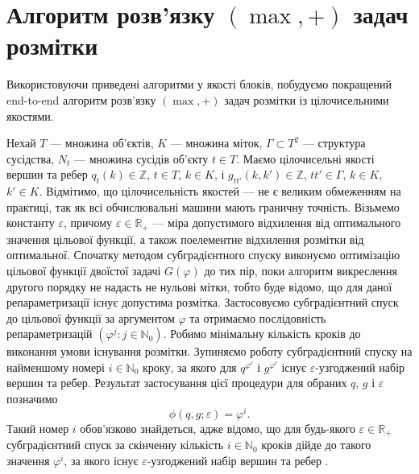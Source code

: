 \section{Алгоритм розв'язку $(\max,+)$ задач розмітки}

Використовуючи приведені алгоритми у якості блоків, побудуємо покращений 
end-to-end алгоритм розв'язку $(\max,+)$ задач розмітки із цілочисельними якостями.

Нехай $T$ --- множина об'єктів, $K$ --- множина міток, $\Gamma \subset T^2$ --- структура сусідства, 
$N_t$ --- множина сусідів об'єкту $t\in T$. Маємо цілочисельні якості вершин та ребер
$q_t(k)\in \mathbb{Z}$, $t\in T$, $k\in K$, і $g_{tt'}(k,k')\in \mathbb{Z}$, $tt'\in\Gamma$, $k\in K$, $k'\in K$.
Відмітимо, що цілочисельність якостей --- не є великим обмеженням на практиці, так як всі обчислювальні машини
мають граничну точність. Візьмемо константу $\varepsilon$, причому $\varepsilon\in\mathbb{R_+}$ --- міра допустимого 
відхилення від оптимального значення цільової функції, а також поелементне відхилення розмітки від оптимальної.
Спочатку методом субградієнтного спуску виконуємо оптимізацію цільової функції двоїстої задачі $G(\varphi)$ до тих пір, поки алгоритм
викреслення другого порядку не надасть не нульові мітки, тобто буде відомо, що 
для даної репараметризації існує допустима розмітка. Застосовуємо субградієнтний 
спуск до цільової функції за аргументом $\varphi$ та отримаємо послідовність
репараметризацій $(\varphi^j:j\in\mathbb{N}_0)$. Робимо мінімальну кількість кроків до виконання умови існування розмітки.
Зупиняємо роботу субградієнтний спуску на найменшому номері $i\in\mathbb{N}_0$ кроку, 
за якого для $q^{\varphi^i}$ і $g^{\varphi^i}$ існує $\varepsilon$-узгоджений набір вершин та ребер.
Результат застосування цієї процедури для обраних $q$, $g$ і $\varepsilon$ позначимо
\begin{equation}
    \phi(q,g;\varepsilon)=\varphi^i.
\end{equation}
Такий номер $i$ обов'язково знайдеться, адже відомо, що для будь-якого 
$\varepsilon\in\mathbb{R_+}$ субградієнтний спуск за скінченну кількість $i\in\mathbb{N}_0$ кроків
дійде до такого значення $\varphi^i$, за якого існує $\varepsilon$-узгоджений набір вершин та ребер \cite{lopatka_stop_cond}.

